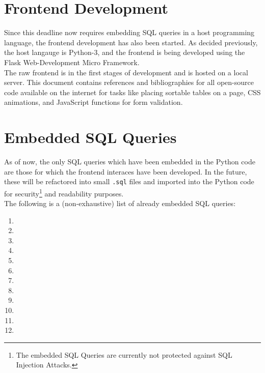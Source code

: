 
\section*{\Huge Frontend Development}
\vspace*{10pt}

Since this deadline now requires embedding SQL queries in a host programming language, the frontend development has also been started.
As decided previously, the host langauge is Python-3, and the frontend is being developed using the Flask Web-Development Micro Framework. \\
The raw frontend is in the first stages of development and is hosted on a local server.
This document contains references and bibliographies for all open-source code available on the internet for tasks like placing sortable tables on a page,
CSS animations, and JavaScript functions for form validation.

\section*{\Huge Embedded SQL Queries}
\vspace*{10pt}

As of now, the only SQL queries which have been embedded in the Python code are those for which the frontend interaces have been developed.
In the future, these will be refactored into small \texttt{.sql} files and imported into the Python code for security\footnote{
    The embedded SQL Queries are currently not protected against SQL Injection Attacks.
} and readability purposes.
\vspace*{10pt} \\
The following is a (non-exhaustive) list of already embedded SQL queries:

\begin{enumerate}
    \item 
    \item 
    \item 
    \item 
    \item 
    \item 
    \item 
    \item 
    \item 
    \item 
    \item 
    \item 
\end{enumerate}

